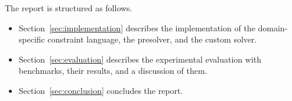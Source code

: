 The report is structured as follows.
\begin{itemize}
    \item Section~\ref{sec:implementation} describes the implementation of the domain-specific constraint language, the presolver, and the custom solver.
    \item Section~\ref{sec:evaluation} describes the experimental evaluation with benchmarks, their results, and a discussion of them.
    \item Section~\ref{sec:conclusion} concludes the report.
\end{itemize}
